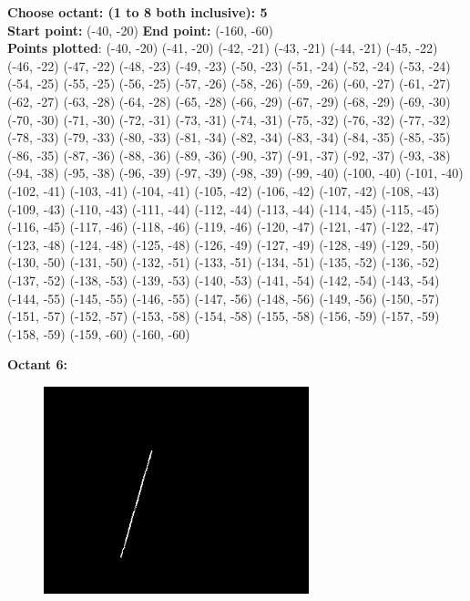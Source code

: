 \documentclass[12pt,letterpaper]{article}
\begin{document}
\textbf{Choose octant: (1 to 8 both inclusive): 5}\\
\textbf{Start point:} (-40, -20)
\textbf{End point:} (-160, -60)\\
\textbf{Points plotted}: 
(-40, -20) (-41, -20) (-42, -21) (-43, -21) 
(-44, -21) (-45, -22) (-46, -22) (-47, -22) 
(-48, -23) (-49, -23) (-50, -23) (-51, -24) 
(-52, -24) (-53, -24) (-54, -25) (-55, -25) 
(-56, -25) (-57, -26) (-58, -26) (-59, -26) 
(-60, -27) (-61, -27) (-62, -27) (-63, -28) 
(-64, -28) (-65, -28) (-66, -29) (-67, -29) 
(-68, -29) (-69, -30) (-70, -30) (-71, -30) 
(-72, -31) (-73, -31) (-74, -31) (-75, -32) 
(-76, -32) (-77, -32) (-78, -33) (-79, -33) 
(-80, -33) (-81, -34) (-82, -34) (-83, -34) 
(-84, -35) (-85, -35) (-86, -35) (-87, -36) 
(-88, -36) (-89, -36) (-90, -37) (-91, -37) 
(-92, -37) (-93, -38) (-94, -38) (-95, -38) 
(-96, -39) (-97, -39) (-98, -39) (-99, -40) 
(-100, -40) (-101, -40) (-102, -41) (-103, -41) 
(-104, -41) (-105, -42) (-106, -42) (-107, -42) 
(-108, -43) (-109, -43) (-110, -43) (-111, -44) 
(-112, -44) (-113, -44) (-114, -45) (-115, -45) 
(-116, -45) (-117, -46) (-118, -46) (-119, -46) 
(-120, -47) (-121, -47) (-122, -47) (-123, -48) 
(-124, -48) (-125, -48) (-126, -49) (-127, -49) 
(-128, -49) (-129, -50) (-130, -50) (-131, -50) 
(-132, -51) (-133, -51) (-134, -51) (-135, -52) 
(-136, -52) (-137, -52) (-138, -53) (-139, -53) 
(-140, -53) (-141, -54) (-142, -54) (-143, -54) 
(-144, -55) (-145, -55) (-146, -55) (-147, -56) 
(-148, -56) (-149, -56) (-150, -57) (-151, -57) 
(-152, -57) (-153, -58) (-154, -58) (-155, -58) 
(-156, -59) (-157, -59) (-158, -59) (-159, -60) 
(-160, -60)

\newpage
\textbf{Octant 6:}
\begin{figure}[h]
    \centering
    \includegraphics[height=6cm]{Outputs/O6-1.png}
\end{figure}
\end{document}
